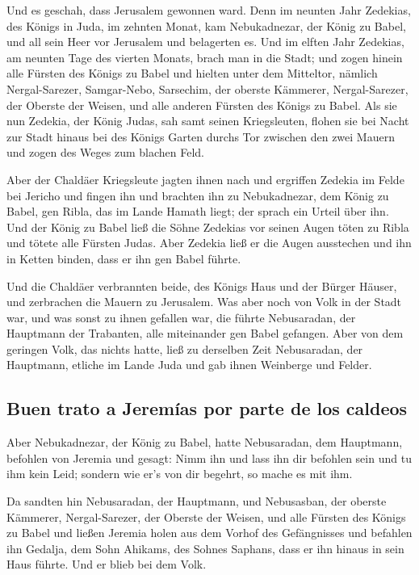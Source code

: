  Und es geschah, dass Jerusalem gewonnen ward. Denn im
neunten Jahr Zedekias, des Königs in Juda, im zehnten Monat, kam
Nebukadnezar, der König zu Babel, und all sein Heer vor Jerusalem und
belagerten es.  Und im elften Jahr Zedekias, am neunten
Tage des vierten Monats, brach man in die Stadt;  und
zogen hinein alle Fürsten des Königs zu Babel und hielten unter dem
Mitteltor, nämlich Nergal-Sarezer, Samgar-Nebo, Sarsechim, der oberste
Kämmerer, Nergal-Sarezer, der Oberste der Weisen, und alle anderen
Fürsten des Königs zu Babel.  Als sie nun Zedekia, der
König Judas, sah samt seinen Kriegsleuten, flohen sie bei Nacht zur
Stadt hinaus bei des Königs Garten durchs Tor zwischen den zwei Mauern
und zogen des Weges zum blachen Feld.

 Aber der Chaldäer Kriegsleute jagten ihnen nach und
ergriffen Zedekia im Felde bei Jericho und fingen ihn und brachten ihn
zu Nebukadnezar, dem König zu Babel, gen Ribla, das im Lande Hamath
liegt; der sprach ein Urteil über ihn.  Und der König zu
Babel ließ die Söhne Zedekias vor seinen Augen töten zu Ribla und tötete
alle Fürsten Judas.  Aber Zedekia ließ er die Augen
ausstechen und ihn in Ketten binden, dass er ihn gen Babel führte.

 Und die Chaldäer verbrannten beide, des Königs Haus und
der Bürger Häuser, und zerbrachen die Mauern zu Jerusalem.
 Was aber noch von Volk in der Stadt war, und was sonst zu
ihnen gefallen war, die führte Nebusaradan, der Hauptmann der Trabanten,
alle miteinander gen Babel gefangen.  Aber von dem
geringen Volk, das nichts hatte, ließ zu derselben Zeit Nebusaradan, der
Hauptmann, etliche im Lande Juda und gab ihnen Weinberge und Felder.

\hypertarget{buen-trato-a-jeremuxedas-por-parte-de-los-caldeos}{%
\subsection{Buen trato a Jeremías por parte de los
caldeos}\label{buen-trato-a-jeremuxedas-por-parte-de-los-caldeos}}

 Aber Nebukadnezar, der König zu Babel, hatte
Nebusaradan, dem Hauptmann, befohlen von Jeremia und gesagt:
 Nimm ihn und lass ihn dir befohlen sein und tu ihm kein
Leid; sondern wie er's von dir begehrt, so mache es mit ihm.

 Da sandten hin Nebusaradan, der Hauptmann, und
Nebusasban, der oberste Kämmerer, Nergal-Sarezer, der Oberste der
Weisen, und alle Fürsten des Königs zu Babel  und ließen
Jeremia holen aus dem Vorhof des Gefängnisses und befahlen ihn Gedalja,
dem Sohn Ahikams, des Sohnes Saphans, dass er ihn hinaus in sein Haus
führte. Und er blieb bei dem Volk.

